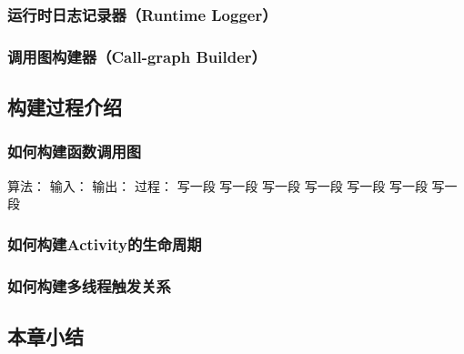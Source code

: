 \subsubsection{	运行时日志记录器（Runtime Logger）}

\subsubsection{调用图构建器（Call-graph Builder）}

\subsection{构建过程介绍}


\subsubsection{如何构建函数调用图}

算法：
输入：
输出：
过程：
写一段
写一段
写一段
写一段
写一段
写一段
写一段

\subsubsection{如何构建Activity的生命周期}

\subsubsection{	如何构建多线程触发关系}

\subsection{本章小结}
